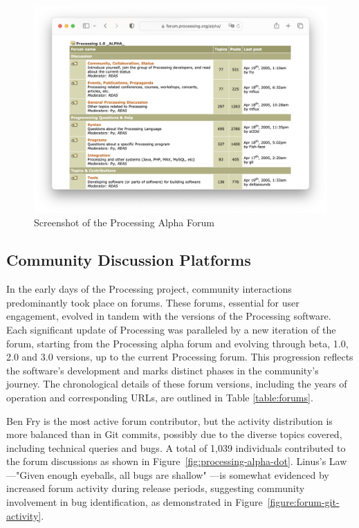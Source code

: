 
\begin{figure}
	\centering
	\includegraphics[width=1.0\textwidth]{images/alpha-browser.png}
	\caption{Screenshot of the Processing Alpha Forum}
	\label{fig:processing-alpha}
\end{figure}

\subsection{Community Discussion Platforms}
In the early days of the Processing project, community interactions predominantly took place on forums. These forums, essential for user engagement, evolved in tandem with the versions of the Processing software. Each significant update of Processing was paralleled by a new iteration of the forum, starting from the Processing alpha forum and evolving through beta, 1.0, 2.0 and 3.0 versions, up to the current Processing forum. This progression reflects the software’s development and marks distinct phases in the community's journey. The chronological details of these forum versions, including the years of operation and corresponding URLs, are outlined in Table \ref{table:forums}. \parencite{ProcessingForum}

Ben Fry is the most active forum contributor, but the activity distribution is more balanced than in Git commits, possibly due to the diverse topics covered, including technical queries and bugs. A total of 1,039 individuals contributed to the forum discussions as shown in Figure~\ref{fig:processing-alpha-dot}.
Linus's Law—"Given enough eyeballs, all bugs are shallow" \parencite[29]{raymondCathedralBazaar1999}—is somewhat evidenced by increased forum activity during release periods, suggesting community involvement in bug identification, as demonstrated in Figure~\ref{figure:forum-git-activity}.


